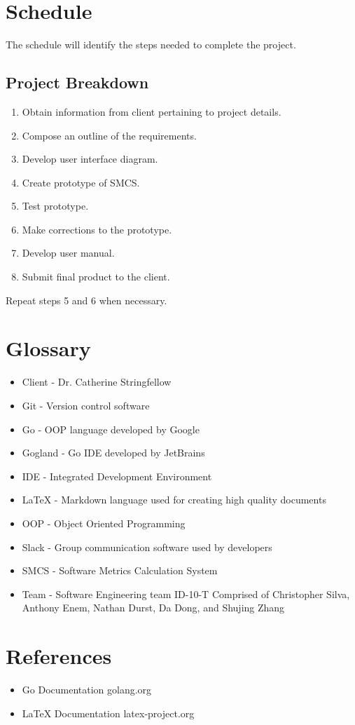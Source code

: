 \documentclass{scrreprt}
\begin{document}
	\chapter{Schedule}
	The schedule will identify the steps needed to complete the project.
	\section{Project Breakdown}
	\begin{enumerate}
		\item Obtain information from client pertaining to project details.
		\item Compose an outline of the requirements.
		\item Develop user interface diagram.
		\item Create prototype of SMCS.
		\item Test prototype.
		\item Make corrections to the prototype.
		\item Develop user manual.
		\item Submit final product to the client.
	\end{enumerate}
	Repeat steps 5 and 6 when necessary.
	\chapter{Glossary}
	\begin{itemize}
		\item Client - Dr. Catherine Stringfellow
		\item Git - Version control software
		\item Go - OOP language developed by Google
		\item Gogland - Go IDE developed by JetBrains
		\item IDE - Integrated Development Environment
		\item LaTeX - Markdown language used for creating high quality documents
		\item OOP - Object Oriented Programming
		\item Slack - Group communication software used by developers
		\item SMCS - Software Metrics Calculation System
		\item Team - Software Engineering team ID-10-T Comprised of Christopher Silva, Anthony Enem, Nathan Durst, Da Dong, and Shujing Zhang
	\end{itemize}
	\chapter{References}
	\begin{itemize}
		\item Go Documentation golang.org
		\item LaTeX Documentation latex-project.org
	\end{itemize}
\end{document}
